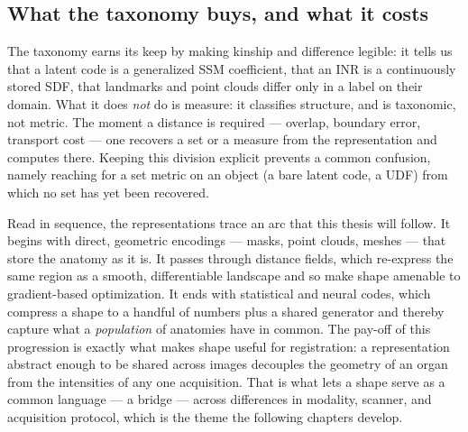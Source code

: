 \subsection{What the taxonomy buys, and what it costs}
\label{sec:shape-closing}

The taxonomy earns its keep by making kinship and difference legible: it tells us that a latent code is a
generalized SSM coefficient, that an INR is a continuously stored SDF, that landmarks and point clouds
differ only in a label on their domain. What it does \emph{not} do is measure: it classifies structure,
and is taxonomic, not metric. The moment a distance is required --- overlap, boundary error,
transport cost --- one recovers a set or a measure from the representation and
computes there. Keeping this division explicit prevents a common confusion, namely reaching for a set
metric on an object (a bare latent code, a UDF) from which no set has yet been recovered.

Read in sequence, the representations trace an arc that this thesis will follow. It begins with direct,
geometric encodings --- masks, point clouds, meshes --- that store the anatomy as it is. It passes through
distance fields, which re-express the same region as a smooth, differentiable landscape and so make shape
amenable to gradient-based optimization. It ends with statistical and neural codes, which compress a shape
to a handful of numbers plus a shared generator and thereby capture what a \emph{population} of anatomies
have in common. The pay-off of this progression is exactly what makes shape useful for registration: a
representation abstract enough to be shared across images decouples the geometry of an organ from the
intensities of any one acquisition. That is what lets a shape serve as a common language --- a bridge ---
across differences in modality, scanner, and acquisition protocol, which is the theme the following
chapters develop.
